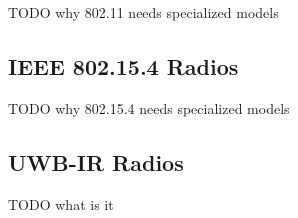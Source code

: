 TODO why 802.11 needs specialized models 

\subsection{IEEE 802.15.4 Radios}
\label{sec:phy:ieee-802154-radios}

TODO why 802.15.4 needs specialized models 

\subsection{UWB-IR Radios}
\label{sec:phy:uwb-ir-radios}

TODO what is it



